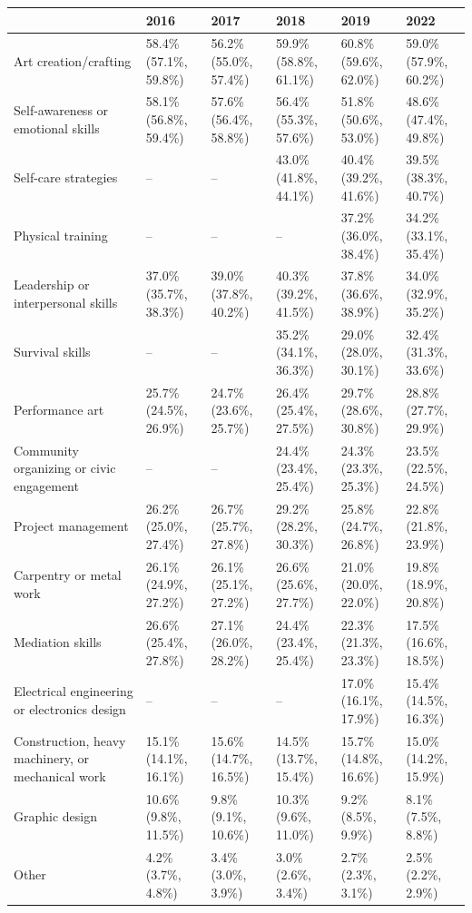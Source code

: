 \documentclass[
]{book}
\begin{document}
\begin{table}
\centering
\begin{tabular}[t]{>{}l|>{}l|>{}l|>{}l|>{}l|>{}l}
\hline
  & 2016 & 2017 & 2018 & 2019 & 2022\\
\hline
Art creation/crafting & 58.4\% (57.1\%, 59.8\%) & 56.2\% (55.0\%, 57.4\%) & 59.9\% (58.8\%, 61.1\%) & 60.8\% (59.6\%, 62.0\%) & 59.0\% (57.9\%, 60.2\%)\\
\hline
Self-awareness or 
 emotional skills & 58.1\% (56.8\%, 59.4\%) & 57.6\% (56.4\%, 58.8\%) & 56.4\% (55.3\%, 57.6\%) & 51.8\% (50.6\%, 53.0\%) & 48.6\% (47.4\%, 49.8\%)\\
\hline
Self-care strategies & -- & -- & 43.0\% (41.8\%, 44.1\%) & 40.4\% (39.2\%, 41.6\%) & 39.5\% (38.3\%, 40.7\%)\\
\hline
Physical training & -- & -- & -- & 37.2\% (36.0\%, 38.4\%) & 34.2\% (33.1\%, 35.4\%)\\
\hline
Leadership or interpersonal skills & 37.0\% (35.7\%, 38.3\%) & 39.0\% (37.8\%, 40.2\%) & 40.3\% (39.2\%, 41.5\%) & 37.8\% (36.6\%, 38.9\%) & 34.0\% (32.9\%, 35.2\%)\\
\hline
Survival skills & -- & -- & 35.2\% (34.1\%, 36.3\%) & 29.0\% (28.0\%, 30.1\%) & 32.4\% (31.3\%, 33.6\%)\\
\hline
Performance art & 25.7\% (24.5\%, 26.9\%) & 24.7\% (23.6\%, 25.7\%) & 26.4\% (25.4\%, 27.5\%) & 29.7\% (28.6\%, 30.8\%) & 28.8\% (27.7\%, 29.9\%)\\
\hline
Community organizing or 
 civic engagement & -- & -- & 24.4\% (23.4\%, 25.4\%) & 24.3\% (23.3\%, 25.3\%) & 23.5\% (22.5\%, 24.5\%)\\
\hline
Project management & 26.2\% (25.0\%, 27.4\%) & 26.7\% (25.7\%, 27.8\%) & 29.2\% (28.2\%, 30.3\%) & 25.8\% (24.7\%, 26.8\%) & 22.8\% (21.8\%, 23.9\%)\\
\hline
Carpentry or metal work & 26.1\% (24.9\%, 27.2\%) & 26.1\% (25.1\%, 27.2\%) & 26.6\% (25.6\%, 27.7\%) & 21.0\% (20.0\%, 22.0\%) & 19.8\% (18.9\%, 20.8\%)\\
\hline
Mediation skills & 26.6\% (25.4\%, 27.8\%) & 27.1\% (26.0\%, 28.2\%) & 24.4\% (23.4\%, 25.4\%) & 22.3\% (21.3\%, 23.3\%) & 17.5\% (16.6\%, 18.5\%)\\
\hline
Electrical engineering or 
 electronics design & -- & -- & -- & 17.0\% (16.1\%, 17.9\%) & 15.4\% (14.5\%, 16.3\%)\\
\hline
Construction, heavy machinery, 
 or mechanical work & 15.1\% (14.1\%, 16.1\%) & 15.6\% (14.7\%, 16.5\%) & 14.5\% (13.7\%, 15.4\%) & 15.7\% (14.8\%, 16.6\%) & 15.0\% (14.2\%, 15.9\%)\\
\hline
Graphic design & 10.6\% (9.8\%, 11.5\%) & 9.8\% (9.1\%, 10.6\%) & 10.3\% (9.6\%, 11.0\%) & 9.2\% (8.5\%, 9.9\%) & 8.1\% (7.5\%, 8.8\%)\\
\hline
Other & 4.2\% (3.7\%, 4.8\%) & 3.4\% (3.0\%, 3.9\%) & 3.0\% (2.6\%, 3.4\%) & 2.7\% (2.3\%, 3.1\%) & 2.5\% (2.2\%, 2.9\%)\\
\hline
\end{tabular}
\end{table}
\end{document}
